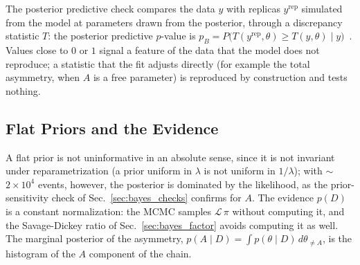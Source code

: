 The posterior predictive check compares the data $y$ with replicas $y^{\mathrm{rep}}$ simulated from the model at parameters drawn from the posterior, through a discrepancy statistic $T$: the posterior predictive $p$-value is $p_B=P\big(T(y^{\mathrm{rep}},\theta)\geq T(y,\theta)\mid y\big)$~\cite{gelman_ppc}. Values close to $0$ or $1$ signal a feature of the data that the model does not reproduce; a statistic that the fit adjusts directly (for example the total asymmetry, when $A$ is a free parameter) is reproduced by construction and tests nothing.

\subsection{Flat Priors and the Evidence}
A flat prior is not uninformative in an absolute sense, since it is not invariant under reparametrization (a prior uniform in $\lambda$ is not uniform in $1/\lambda$); with $\sim$$2\times10^4$ events, however, the posterior is dominated by the likelihood, as the prior-sensitivity check of Sec.~\ref{sec:bayes_checks} confirms for $A$. The evidence $p(D)$ is a constant normalization: the MCMC samples $\mathcal{L}\,\pi$ without computing it, and the Savage-Dickey ratio of Sec.~\ref{sec:bayes_factor} avoids computing it as well. The marginal posterior of the asymmetry, $p(A\mid D)=\int p(\theta\mid D)\,d\theta_{\neq A}$, is the histogram of the $A$ component of the chain.

